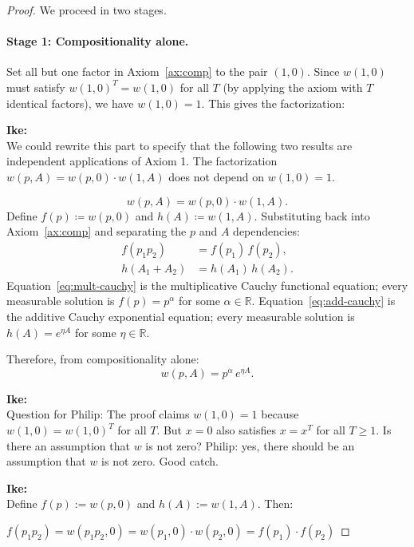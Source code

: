 \documentclass[11pt]{article}
\theoremstyle{definition}
\theoremstyle{remark}
\newenvironment{ike}{\color{blue}\textbf{Ike:}\\}{}
\newcommand{\R}{\mathbb{R}}
\begin{document}
\begin{proof}
We proceed in two stages.

\paragraph{Stage 1: Compositionality alone.}
Set all but one factor in Axiom~\ref{ax:comp} to the pair $(1, 0)$. Since $w(1,0)$ must satisfy $w(1,0)^T = w(1,0)$ for all $T$ (by applying the axiom with $T$ identical factors), we have $w(1,0) = 1$. This gives the factorization:

\begin{ike}
We could rewrite this part to specify that the following two results are independent applications of Axiom 1. The factorization $w(p,A) = w(p,0) \cdot w(1,A)$ does not depend on $w(1,0) = 1$.
\end{ike}

\[
  w(p, A) = w(p, 0) \cdot w(1, A).
\]
Define $f(p) \coloneqq w(p, 0)$ and $h(A) \coloneqq w(1, A)$. Substituting back into Axiom~\ref{ax:comp} and separating the $p$ and $A$ dependencies:
\begin{align}
  f(p_1 p_2) &= f(p_1)\,f(p_2), \label{eq:mult-cauchy}\\
  h(A_1 + A_2) &= h(A_1)\,h(A_2). \label{eq:add-cauchy}
\end{align}
Equation~\eqref{eq:mult-cauchy} is the multiplicative Cauchy functional equation; every measurable solution is $f(p) = p^\alpha$ for some $\alpha \in \R$. Equation~\eqref{eq:add-cauchy} is the additive Cauchy exponential equation; every measurable solution is $h(A) = e^{\eta A}$ for some $\eta \in \R$.

Therefore, from compositionality alone:
\begin{equation}\label{eq:general}
  w(p, A) = p^\alpha\, e^{\eta A}.
\end{equation}

\begin{ike}
Question for Philip: The proof claims $w(1,0) = 1$ because $w(1,0) = w(1,0)^T$ for all $T$. But $x = 0$ also satisfies $x = x^T$ for all $T \geq 1$. Is there an assumption that $w$ is not zero?
\end{ike}
Philip: yes, there should be an assumption that $w$ is not zero. Good catch.

\begin{ike}
Define $f(p) := w(p, 0)$ and $h(A) := w(1, A)$. Then:

$f(p_1 p_2) = w(p_1 p_2, 0) = w(p_1, 0) \cdot w(p_2, 0) = f(p_1) \cdot f(p_2)$


\end{ike}
\end{proof}
\end{document}
